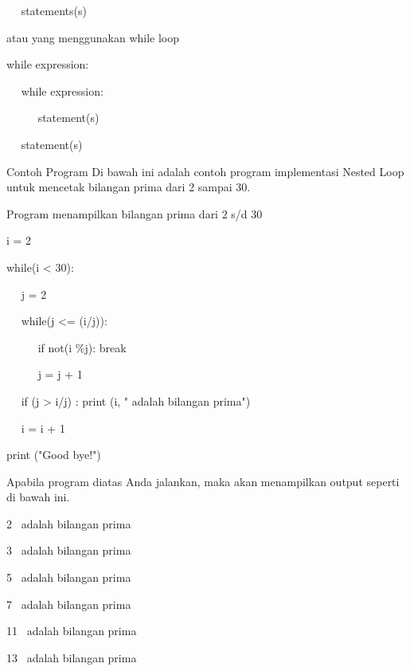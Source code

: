 ~~ statements(s) \par
\vspace{\baselineskip}
atau yang menggunakan while loop\vspace{\baselineskip}
\vspace{\baselineskip}
 \par
while expression: \par
~~ while expression: \par
~~~~~ statement(s) \par
~~ statement(s) \par
\vspace{\baselineskip}
Contoh Program\vspace{\baselineskip}
\vspace{\baselineskip}
Di bawah ini adalah contoh program implementasi Nested Loop untuk mencetak bilangan prima dari 2 sampai 30.\vspace{\baselineskip}
\vspace{\baselineskip}
 \par
Program menampilkan bilangan prima dari 2 s/d 30 \par
\vspace{12pt}
i = 2 \par
while(i < 30): \par
~~ j = 2 \par
~~ while(j <= (i/j)): \par
~~~~~ if not(i $  \%  $j): break \par
~~~~~ j = j + 1 \par
~~ if (j > i/j) : print (i, " adalah bilangan prima") \par
~~ i = i + 1 \par
\vspace{12pt}
print ("Good bye!") \par
\vspace{12pt}
\vspace{\baselineskip}
Apabila program diatas Anda jalankan, maka akan menampilkan output seperti di bawah ini.\vspace{\baselineskip}
\vspace{\baselineskip}
 \par
2~ adalah bilangan prima \par
3~ adalah bilangan prima \par
5~ adalah bilangan prima \par
7~ adalah bilangan prima \par
11~ adalah bilangan prima \par
13~ adalah bilangan prima \par
